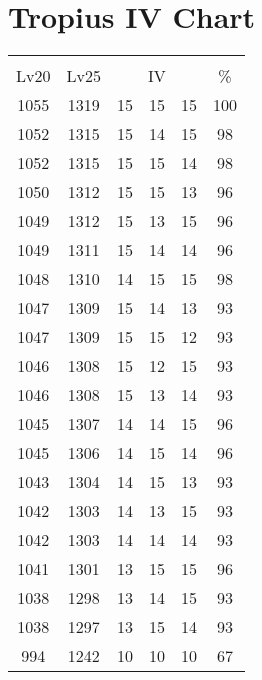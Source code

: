 \documentclass{article}%
\begin{document}
%
\normalsize%
\section{Tropius IV Chart}%
\label{sec:Tropius IV Chart}%
\renewcommand{\arraystretch}{1.5}%
\begin{tabular}{|c|c|c|c|c|c|}%
\hline%
\multicolumn{6}{|c|}{\textcolor{white}{ 
\linebreak{Tropius}
}%
\cellcolor{black}}\\%
\multicolumn{1}{|c}{Lv20}&\multicolumn{1}{c|}{Lv25}&\multicolumn{3}{c|}{IV}&\multicolumn{1}{|c|}{\%}\\%
\hline%
\rowcolor{color100}%
1055&1319&15&15&15&100\\%
\hline%
\rowcolor{color98}%
1052&1315&15&14&15&98\\%
\hline%
\rowcolor{color98}%
1052&1315&15&15&14&98\\%
\hline%
\rowcolor{color96}%
1050&1312&15&15&13&96\\%
\hline%
\rowcolor{color96}%
1049&1312&15&13&15&96\\%
\hline%
\rowcolor{color96}%
1049&1311&15&14&14&96\\%
\hline%
\rowcolor{color98}%
1048&1310&14&15&15&98\\%
\hline%
\rowcolor{color93}%
1047&1309&15&14&13&93\\%
\hline%
\rowcolor{color93}%
1047&1309&15&15&12&93\\%
\hline%
\rowcolor{color93}%
1046&1308&15&12&15&93\\%
\hline%
\rowcolor{color93}%
1046&1308&15&13&14&93\\%
\hline%
\rowcolor{color96}%
1045&1307&14&14&15&96\\%
\hline%
\rowcolor{color96}%
1045&1306&14&15&14&96\\%
\hline%
\rowcolor{color93}%
1043&1304&14&15&13&93\\%
\hline%
\rowcolor{color93}%
1042&1303&14&13&15&93\\%
\hline%
\rowcolor{color93}%
1042&1303&14&14&14&93\\%
\hline%
\rowcolor{color96}%
1041&1301&13&15&15&96\\%
\hline%
\rowcolor{color93}%
1038&1298&13&14&15&93\\%
\hline%
\rowcolor{color93}%
1038&1297&13&15&14&93\\%
\hline%
\rowcolor{color91}%
994&1242&10&10&10&67\\%
\end{tabular}

%
\end{document}
